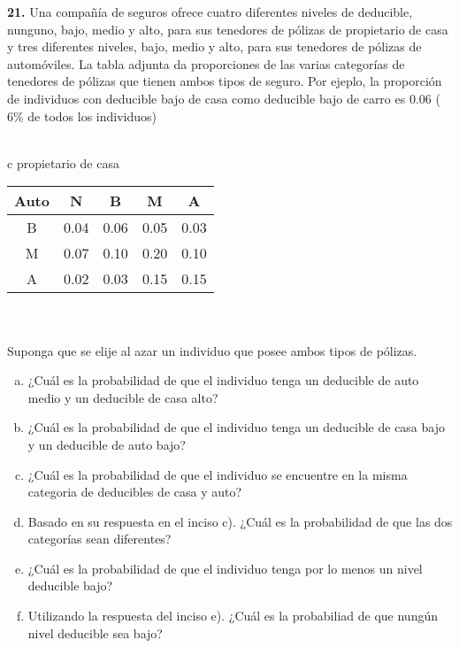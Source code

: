 \documentclass[12pt, letterpaper, spanish]{article}
\begin{document}
\textbf{21.} Una compañía de seguros ofrece cuatro diferentes niveles de deducible, nunguno, bajo, medio y alto, para sus tenedores de pólizas de propietario de casa y tres diferentes niveles, bajo, medio y alto, para sus tenedores de pólizas de automóviles. La tabla adjunta da proporciones de las varias categorías de tenedores de pólizas que tienen ambos tipos de seguro. Por ejeplo, la proporción de individuos con deducible bajo de casa como deducible bajo de carro es 0.06 ($6\%$ de todos los individuos)\\ \\
\begin{tabular}{c}
    propietario de casa  \\
    \begin{tabular}{ccccc}
        \hline
        Auto & N & B & M & A\\ \hline
        B & 0.04 & 0.06 & 0.05 & 0.03\\
        M & 0.07 & 0.10 & 0.20 & 0.10\\
        A & 0.02 & 0.03 & 0.15 & 0.15

    \end{tabular}
\end{tabular}\\ \\
Suponga que se elije al azar un individuo que posee ambos tipos de pólizas.

\begin{enumerate}[a)]
    \item ¿Cuál es la probabilidad de que el individuo tenga un deducible de auto medio y un deducible de casa alto?
    \item ¿Cuál es la probabilidad de que el individuo tenga un deducible de casa bajo y un deducible de auto bajo?
    \item ¿Cuál es la probabilidad de que el individuo se encuentre en la misma categoria de deducibles de casa y auto?
    \item Basado en su respuesta en el inciso c). ¿Cuál es la probabilidad de que las dos categorías sean diferentes?
    \item ¿Cuál es la probabilidad de que el individuo tenga por lo menos un nivel deducible bajo?
    \item Utilizando la respuesta del inciso e). ¿Cuál es la probabiliad de que nungún nivel deducible sea bajo?
\end{enumerate}\\ \\ \\
\end{document}
